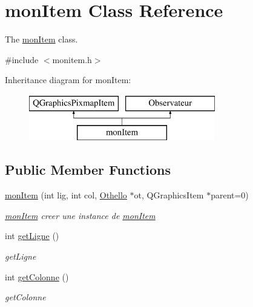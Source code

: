 \hypertarget{classmon_item}{}\section{mon\+Item Class Reference}
\label{classmon_item}


The \hyperlink{classmon_item}{mon\+Item} class.  




{\ttfamily \#include $<$monitem.\+h$>$}

Inheritance diagram for mon\+Item\+:\begin{figure}[H]
\begin{center}
\leavevmode
\includegraphics[height=2.000000cm]{classmon_item}
\end{center}
\end{figure}
\subsection*{Public Member Functions}
\begin{DoxyCompactItemize}
\item 
\hyperlink{classmon_item_a60f2f43e1320b35c90dea47e75925a92}{mon\+Item} (int lig, int col, \hyperlink{class_othello}{Othello} $\ast$ot, Q\+Graphics\+Item $\ast$parent=0)
\begin{DoxyCompactList}\small\item\em \hyperlink{classmon_item}{mon\+Item} creer une instance de \hyperlink{classmon_item}{mon\+Item} \end{DoxyCompactList}\item 
int \hyperlink{classmon_item_a63b914953757e5466191cfde0c8d1f1d}{get\+Ligne} ()
\begin{DoxyCompactList}\small\item\em get\+Ligne \end{DoxyCompactList}\item 
int \hyperlink{classmon_item_a3e37c4f04585466a8aa25c151b866feb}{get\+Colonne} ()
\begin{DoxyCompactList}\small\item\em get\+Colonne \end{DoxyCompactList}\end{DoxyCompactItemize}

